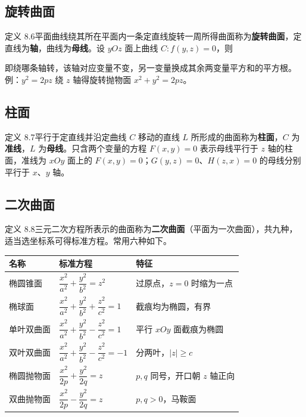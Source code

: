 \subsection{旋转曲面}

定义 8.6\quad 平面曲线绕其所在平面内一条定直线旋转一周所得曲面称为\textbf{旋转曲面}，定直线为\textbf{轴}，曲线为\textbf{母线}。设 $yOz$ 面上曲线 $C:f(y,z)=0$，则


即绕哪条轴转，该轴对应变量不变，另一变量换成其余两变量平方和的平方根。例：$y^{2}=2pz$ 绕 $z$ 轴得旋转抛物面 $x^{2}+y^{2}=2pz$。

\subsection{柱面}

定义 8.7\quad 平行于定直线并沿定曲线 $C$ 移动的直线 $L$ 所形成的曲面称为\textbf{柱面}，$C$ 为\textbf{准线}，$L$ 为\textbf{母线}。只含两个变量的方程 $F(x,y)=0$ 表示母线平行于 $z$ 轴的柱面，准线为 $xOy$ 面上的 $F(x,y)=0$；$G(y,z)=0$、$H(z,x)=0$ 的母线分别平行于 $x$、$y$ 轴。


\subsection{二次曲面}

定义 8.8\quad 三元二次方程所表示的曲面称为\textbf{二次曲面}（平面为一次曲面），共九种，适当选坐标系可得标准方程。常用六种如下。

\begin{center}
\begin{tabular}{lll}
\toprule
名称 & 标准方程 & 特征 \\
\midrule
椭圆锥面 & $\dfrac{x^{2}}{a^{2}}+\dfrac{y^{2}}{b^{2}}=z^{2}$ & 过原点，$z=0$ 时缩为一点 \\
椭球面 & $\dfrac{x^{2}}{a^{2}}+\dfrac{y^{2}}{b^{2}}+\dfrac{z^{2}}{c^{2}}=1$ & 截痕均为椭圆，有界 \\
单叶双曲面 & $\dfrac{x^{2}}{a^{2}}+\dfrac{y^{2}}{b^{2}}-\dfrac{z^{2}}{c^{2}}=1$ & 平行 $xOy$ 面截痕为椭圆 \\
双叶双曲面 & $\dfrac{x^{2}}{a^{2}}+\dfrac{y^{2}}{b^{2}}-\dfrac{z^{2}}{c^{2}}=-1$ & 分两叶，$|z|\ge c$ \\
椭圆抛物面 & $\dfrac{x^{2}}{2p}+\dfrac{y^{2}}{2q}=z$ & $p,q$ 同号，开口朝 $z$ 轴正向 \\
双曲抛物面 & $\dfrac{x^{2}}{2p}-\dfrac{y^{2}}{2q}=z$ & $p,q>0$，马鞍面 \\
\bottomrule
\end{tabular}
\end{center}

